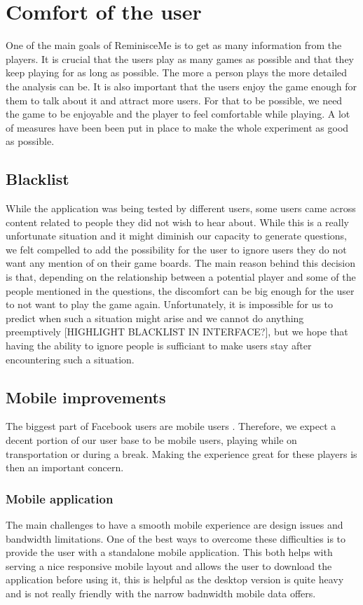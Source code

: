 \section{Comfort of the user}
One of the main goals of ReminisceMe is to get as many information from the players. It is crucial that the users play as many games as possible and that they keep playing for as long as possible. The more a person plays the more detailed the analysis can be. It is also important that the users enjoy the game enough for them to talk about it and attract more users. For that to be possible, we need the game to be enjoyable and the player to feel comfortable while playing. A lot of measures have been been put in place to make the whole experiment as good as possible.
\subsection{Blacklist}
While the application was being tested by different users, some users came across content related to people they did not wish to hear about. While this is a really unfortunate situation and it might diminish our capacity to generate questions, we felt compelled to add the possibility for the user to ignore users they do not want any mention of on their game boards. The main reason behind this decision is that, depending on the relationship between a potential player and some of the people mentioned in the questions, the discomfort can be big enough for the user to not want to play the game again. Unfortunately, it is impossible for us to predict when such a situation might arise and we cannot do anything preemptively [HIGHLIGHT BLACKLIST IN INTERFACE?], but we hope that having the ability to ignore people is sufficiant to make users stay after encountering such a situation.
\subsection{Mobile improvements}
The biggest part of Facebook users are mobile users \cite{mobileusage}. Therefore, we expect a decent portion of our user base to be mobile users, playing while on transportation or during a break. Making the experience great for these players is then an important concern.
\subsubsection{Mobile application}
The main challenges to have a smooth mobile experience are design issues and bandwidth limitations. One of the best ways to overcome these difficulties is to provide the user with a standalone mobile application. This both helps with serving a nice responsive mobile layout and allows the user to download the application before using it, this is helpful as the desktop version is quite heavy and is not really friendly with the narrow badnwidth mobile data offers.

